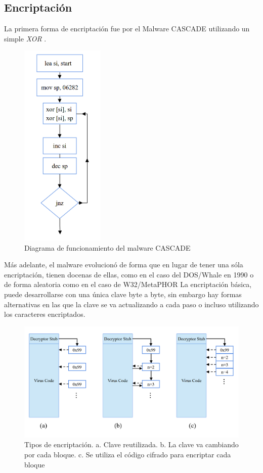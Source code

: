 \documentclass[15pt]{article}
\begin{document}
	\subsection{Encriptación}
	La primera forma de encriptación fue por el Malware CASCADE utilizando un simple \textit{XOR} \cite{cascade}.
	\begin{figure}[H]
		\centering
		\includegraphics[width=4cm]{images/cascade.png}
		\caption{Diagrama de funcionamiento del malware CASCADE}
	\end{figure}
	Más adelante, el malware evolucionó de forma que en lugar de tener una sóla encriptación, tienen docenas de ellas, como en el caso del DOS/Whale en 1990 \cite{whale} o de forma aleatoria como en el caso de W32/MetaPHOR \cite{metaphor}
	La encriptación básica, puede desarrollarse con una única clave byte a byte, sin embargo hay formas alternativas en las que la clave se va actualizando a cada paso o incluso utilizando los caracteres encriptados.
	
	\begin{figure}[H]
		\centering
		\includegraphics[width=12cm]{images/encrypt.png}
		\caption{Tipos de encriptación. a. Clave reutilizada. b. La clave va cambiando por cada bloque. c. Se utiliza el código cifrado para encriptar cada bloque}
	\end{figure}
\end{document}
